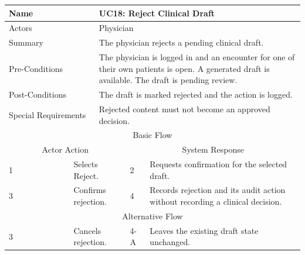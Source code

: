 \begin{reporttable}
\centering
\small
\caption{UC18: Reject Clinical Draft.}
\label{tab:kashaf:uc18}
\begin{tabular}{|p{}|p{}|p{}|p{}|p{}|}
\hline
\multicolumn{2}{|p{\dimexpr0.225\textwidth+2\tabcolsep+\arrayrulewidth\relax}|}{Name} & \multicolumn{3}{p{\dimexpr0.575\textwidth+4\tabcolsep+2\arrayrulewidth\relax}|}{UC18: Reject Clinical Draft} \\ \hline
\multicolumn{2}{|p{\dimexpr0.225\textwidth+2\tabcolsep+\arrayrulewidth\relax}|}{Actors} & \multicolumn{3}{p{\dimexpr0.575\textwidth+4\tabcolsep+2\arrayrulewidth\relax}|}{Physician} \\ \hline
\multicolumn{2}{|p{\dimexpr0.225\textwidth+2\tabcolsep+\arrayrulewidth\relax}|}{Summary} & \multicolumn{3}{p{\dimexpr0.575\textwidth+4\tabcolsep+2\arrayrulewidth\relax}|}{The physician rejects a pending clinical draft.} \\ \hline
\multicolumn{2}{|p{\dimexpr0.225\textwidth+2\tabcolsep+\arrayrulewidth\relax}|}{Pre-Conditions} & \multicolumn{3}{p{\dimexpr0.575\textwidth+4\tabcolsep+2\arrayrulewidth\relax}|}{The physician is logged in and an encounter for one of their own patients is open. A generated draft is available. The draft is pending review.} \\ \hline
\multicolumn{2}{|p{\dimexpr0.225\textwidth+2\tabcolsep+\arrayrulewidth\relax}|}{Post-Conditions} & \multicolumn{3}{p{\dimexpr0.575\textwidth+4\tabcolsep+2\arrayrulewidth\relax}|}{The draft is marked rejected and the action is logged.} \\ \hline
\multicolumn{2}{|p{\dimexpr0.225\textwidth+2\tabcolsep+\arrayrulewidth\relax}|}{Special Requirements} & \multicolumn{3}{p{\dimexpr0.575\textwidth+4\tabcolsep+2\arrayrulewidth\relax}|}{Rejected content must not become an approved decision.} \\ \hline
\multicolumn{5}{|c|}{Basic Flow} \\ \hline
\multicolumn{3}{|c|}{Actor Action} & \multicolumn{2}{c|}{System Response} \\ \hline
1 & \multicolumn{2}{p{\dimexpr0.37\textwidth+2\tabcolsep+\arrayrulewidth\relax}|}{Selects Reject.} & 2 & Requests confirmation for the selected draft. \\ \hline
3 & \multicolumn{2}{p{\dimexpr0.37\textwidth+2\tabcolsep+\arrayrulewidth\relax}|}{Confirms rejection.} & 4 & Records rejection and its audit action without recording a clinical decision. \\ \hline
\multicolumn{5}{|c|}{Alternative Flow} \\ \hline
3 & \multicolumn{2}{p{\dimexpr0.37\textwidth+2\tabcolsep+\arrayrulewidth\relax}|}{Cancels rejection.} & 4-A & Leaves the existing draft state unchanged. \\ \hline
\end{tabular}
\end{reporttable}

